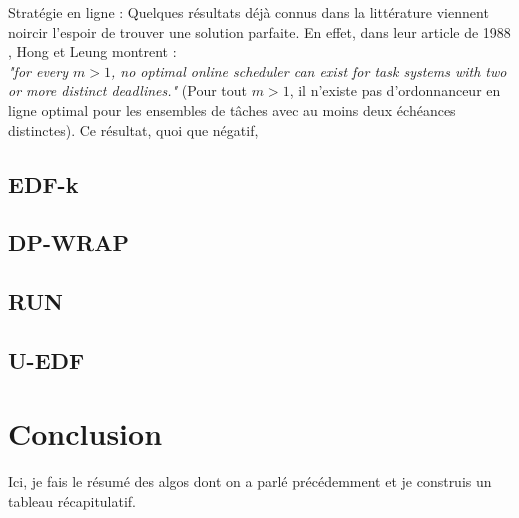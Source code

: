 \documentclass[11pt,a4paper,oneside]{report}
\begin{document}
Stratégie en ligne :
Quelques résultats déjà connus dans la littérature viennent noircir l'espoir de trouver une 
solution parfaite. En effet, dans leur article de 1988 \cite{hong_-line_1988}, Hong et Leung montrent :\\
\textit{"for every $m > 1$, no optimal online scheduler can exist for task systems with two or more distinct
	deadlines."} (Pour tout $m > 1$, il n'existe pas d'ordonnanceur en ligne 
optimal pour les ensembles de tâches avec au moins deux échéances distinctes). 
Ce résultat, quoi que négatif, 

\subsection{EDF-k}
\subsection{DP-WRAP}
\subsection{RUN}
\subsection{U-EDF}


\section{Conclusion}

Ici, je fais le résumé des algos dont on a parlé précédemment et je construis un tableau récapitulatif. 



\end{document}
